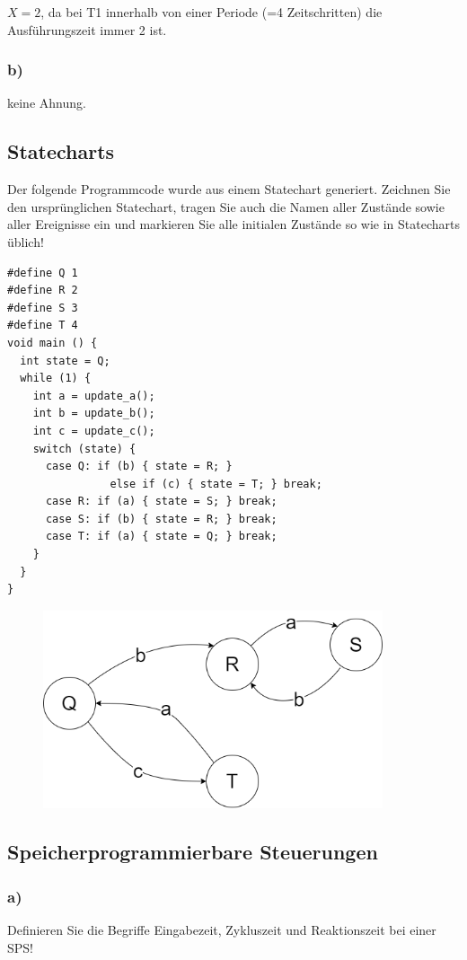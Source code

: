 $X=2$, da bei T1 innerhalb von einer Periode (=4 Zeitschritten) die Ausführungszeit immer 2 ist.

\subsubsection{b)}
keine Ahnung.

\subsection{Statecharts}
Der folgende Programmcode wurde aus einem Statechart generiert. Zeichnen Sie den ursprünglichen
Statechart, tragen Sie auch die Namen aller Zustände sowie aller Ereignisse ein und markieren Sie alle
initialen Zustände so wie in Statecharts üblich!

\begin{lstlisting}
#define Q 1
#define R 2
#define S 3
#define T 4
void main () {
  int state = Q;
  while (1) {
    int a = update_a();
    int b = update_b();
    int c = update_c();
    switch (state) {
      case Q: if (b) { state = R; }
                else if (c) { state = T; } break;
      case R: if (a) { state = S; } break;
      case S: if (b) { state = R; } break;
      case T: if (a) { state = Q; } break;
    }
  }
}
\end{lstlisting}

\begin{figure}[H]
  \includegraphics[width=10cm]{images/KA280521/5a.PNG}
  \centering
\end{figure}

\subsection{Speicherprogrammierbare Steuerungen}

\subsubsection{a)}
Definieren Sie die Begriffe Eingabezeit, Zykluszeit und Reaktionszeit bei einer SPS!

